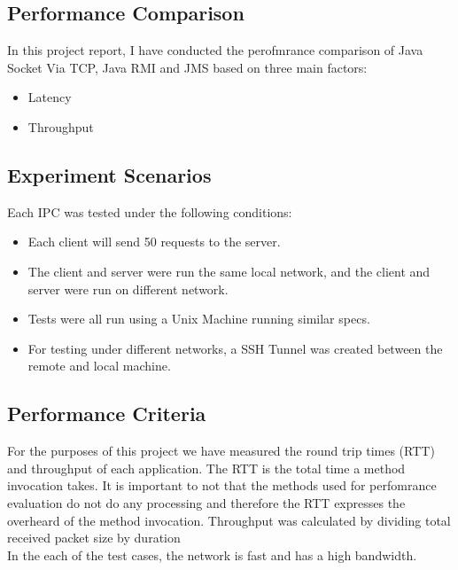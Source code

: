 \documentclass{article}
\begin{document}
\subsection{Performance Comparison}
In this project report, I have conducted the perofmrance comparison of Java Socket Via TCP, Java RMI and JMS based on three main factors:
\begin{itemize}
\item Latency
\item Throughput
\end{itemize}

\subsection{Experiment Scenarios}
Each IPC was tested under the following conditions:
\begin{itemize}
	\item Each client will send 50 requests to the server.
	\item The client and server were run the same local network, and the client and server were run
	on different network.
	\item Tests were all run using a Unix Machine running similar specs. 
	\item For testing under different networks, a SSH Tunnel was created between the remote and local machine.
\end{itemize}

\subsection{Performance Criteria}
For the purposes of this project we have measured the round trip times (RTT) and throughput of each application. The RTT is the total time a method invocation takes. It is important to not that the methods used for perfomrance evaluation do not do any processing and therefore the RTT expresses the overheard of the method invocation. Throughput was calculated by dividing total received packet size by duration \\

In the each of the test cases, the network is fast and has a high bandwidth.





 
\end{document}

